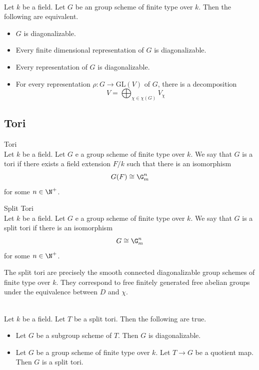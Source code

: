 \documentclass[a4paper]{article}
\begin{document}
\begin{prp}{}{}\\
Let $k$ be a field. Let $G$ be an group scheme of finite type over $k$. Then the following are equivalent. 
\begin{itemize}
\item $G$ is diagonalizable. 
\item Every finite dimensional representation of $G$ is diagonalizable. 
\item Every representation of $G$ is diagonalizable. 
\item For every representation $\rho:G\to\text{GL}(V)$ of $G$, there is a decomposition $$V=\bigoplus_{\chi\in\chi(G)}V_\chi$$
\end{itemize}
\end{prp}

\subsection{Tori}
\begin{defn}{Tori}{}\\
Let $k$ be a field. Let $G$ e a group scheme of finite type over $k$. We say that $G$ is a tori if there exists a field extension $F/k$ such that there is an isomorphism $$G(F)\cong\G_m^n$$ for some $n\in\N^+$. 
\end{defn}

\begin{defn}{Split Tori}{}\\
Let $k$ be a field. Let $G$ e a group scheme of finite type over $k$. We say that $G$ is a split tori if there is an isomorphism $$G\cong\G_m^n$$ for some $n\in\N^+$. 
\end{defn}

The split tori are precisely the smooth connected diagonalizable group schemes of finite type over $k$. They correspond to free finitely generated free abelian groups under the equivalence between $D$ and $\chi$. 

\begin{prp}{}{}\\
Let $k$ be a field. Let $T$ be a split tori. Then the following are true. 
\begin{itemize}
\item Let $G$ be a subgroup scheme of $T$. Then $G$ is diagonalizable. 
\item Let $G$ be a group scheme of finite type over $k$. Let $T\to G$ be a quotient map. Then $G$ is a split tori. 
\end{itemize}
\end{prp}
\end{document}
